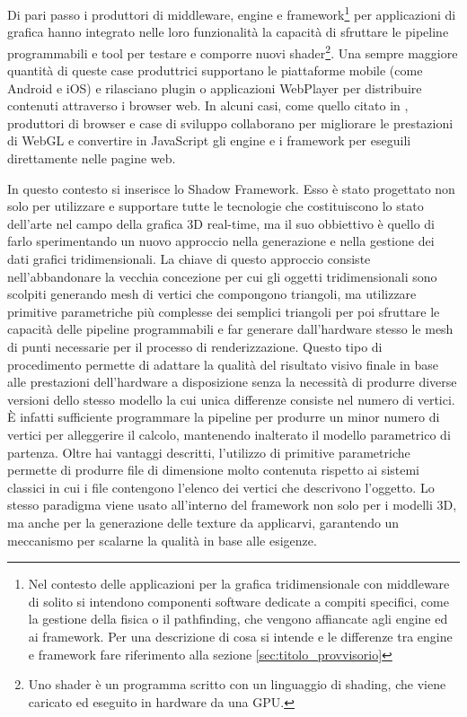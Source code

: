 Di pari passo i produttori di middleware, engine e framework\footnote{Nel contesto delle applicazioni per la grafica tridimensionale con middleware di solito si intendono componenti software dedicate a compiti specifici, come la gestione della fisica o il pathfinding, che vengono affiancate agli engine ed ai framework. Per una descrizione di cosa si intende e le differenze tra engine e framework fare riferimento alla sezione \ref{sec:titolo_provvisorio}} %
 per applicazioni di grafica hanno integrato nelle loro funzionalit\`a la capacit\`a di sfruttare le pipeline programmabili e tool per testare e comporre nuovi shader\footnote{Uno shader \`e un programma scritto con un linguaggio di shading, che viene caricato ed eseguito in hardware da una \ac{GPU}.}. Una sempre maggiore quantit\`a di queste case produttrici supportano le piattaforme mobile (come Android e iOS) e rilasciano plugin o applicazioni WebPlayer per distribuire contenuti attraverso i browser web. 
In alcuni casi, come quello citato in \cite{site:mozillaunrealannounce}, produttori di browser e case di sviluppo collaborano per migliorare le prestazioni di WebGL e convertire in JavaScript gli engine e i framework per eseguili direttamente nelle pagine web.

In questo contesto si inserisce lo Shadow Framework. Esso \`e stato progettato non solo per utilizzare e supportare tutte le tecnologie che costituiscono lo stato dell'arte nel campo della grafica 3D real-time, ma il suo obbiettivo \`e quello di farlo sperimentando un nuovo approccio nella generazione e nella gestione dei dati grafici tridimensionali. La chiave di questo approccio consiste nell'abbandonare la vecchia concezione per cui gli oggetti tridimensionali sono scolpiti generando mesh di vertici che compongono triangoli, ma utilizzare primitive parametriche pi\`u complesse dei semplici triangoli per poi sfruttare le capacit\`a delle pipeline programmabili e far generare dall'hardware stesso le mesh di punti necessarie per il processo di renderizzazione.
Questo tipo di procedimento permette di adattare la qualit\`a  del risultato visivo finale in base alle prestazioni dell'hardware a disposizione senza la necessit\`a di produrre diverse versioni dello stesso modello la cui unica differenze consiste nel numero di vertici. \`E infatti sufficiente programmare la pipeline per produrre un minor numero di vertici per alleggerire il calcolo, mantenendo inalterato il modello parametrico di partenza. Oltre hai vantaggi descritti, l'utilizzo di primitive parametriche permette di produrre file di dimensione molto contenuta rispetto ai sistemi classici in cui i file contengono l'elenco dei vertici che descrivono l'oggetto. Lo stesso paradigma viene usato all'interno del framework non solo per i modelli 3D, ma anche per la generazione delle texture da applicarvi, garantendo un meccanismo per scalarne la qualit\`a in base alle esigenze.

